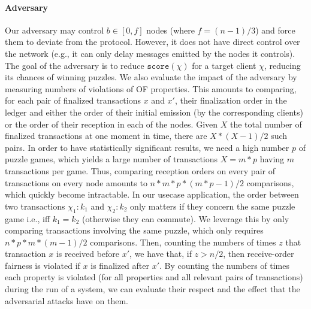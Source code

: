\paragraph{Adversary}
Our adversary may control $b \in [0,f]$ nodes (where $f = (n-1)/3$) and force them to deviate from the protocol. However, it does not have direct control over the network (e.g., it can only delay messages emitted by the nodes it controls).
The goal of the adversary is to reduce $\mathtt{score}(\chi)$ for a target client $\chi$, reducing its chances of winning puzzles.
We also evaluate the impact of the adversary by measuring numbers of violations of OF properties.
This amounts to comparing, for each pair of finalized transactions $x$ and $x'$, their finalization order in the ledger and either the order of their initial emission (by the corresponding clients) or the order of their reception in each of the nodes.
Given $X$ the total number of finalized transactions at one moment in time, there are $X*(X-1)/2$ such pairs. 
In order to have statistically significant results, we need a high number $p$ of puzzle games, which yields a large number of transactions $X = m*p$ having $m$ transactions per game.
Thus, comparing reception orders on every pair of transactions on every node amounts to $n*m*p*(m*p -1)/2$ comparisons, which quickly become intractable.
In our usecase application, the order between two transactions $\chi_1:k_1$ and $\chi_2:k_2$ only matters if they concern the same puzzle game i.e., iff $k_1 = k_2$ (otherwise they can commute).
We leverage this by only comparing transactions involving the same puzzle, which only requires $n*p*m*(m-1)/2$ comparisons.
Then, counting the numbers of times $z$ that transaction $x$ is received before $x'$, we have that, if $z > n/2$, then receive-order fairness is violated if $x$ is finalized after $x'$.
By counting the numbers of times each property is violated (for all properties and all relevant pairs of transactions) during the run of a system, we can evaluate their respect and the effect that the adversarial attacks have on them.


